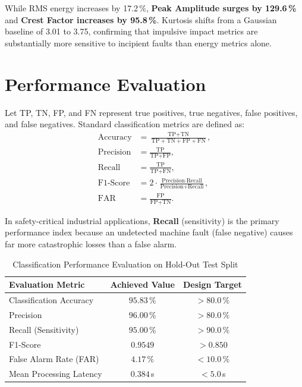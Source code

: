 \documentclass[conference,a4paper]{IEEEtran}
\begin{document}
While RMS energy increases by 17.2\,\%, \textbf{Peak Amplitude surges by 129.6\,\%} and \textbf{Crest Factor increases by 95.8\,\%}. Kurtosis shifts from a Gaussian baseline of 3.01 to 3.75, confirming that impulsive impact metrics are substantially more sensitive to incipient faults than energy metrics alone.

\section{Performance Evaluation}
Let TP, TN, FP, and FN represent true positives, true negatives, false positives, and false negatives. Standard classification metrics are defined as:
\begin{align}
    \text{Accuracy}  &= \frac{\text{TP} + \text{TN}}{\text{TP} + \text{TN} + \text{FP} + \text{FN}}, \label{eq:acc} \\
    \text{Precision} &= \frac{\text{TP}}{\text{TP} + \text{FP}}, \label{eq:prec} \\
    \text{Recall}    &= \frac{\text{TP}}{\text{TP} + \text{FN}}, \label{eq:rec} \\
    \text{F1-Score}  &= 2 \cdot \frac{\text{Precision} \cdot \text{Recall}}{\text{Precision} + \text{Recall}}, \label{eq:f1} \\
    \text{FAR}       &= \frac{\text{FP}}{\text{FP} + \text{TN}}. \label{eq:far}
\end{align}

In safety-critical industrial applications, \textbf{Recall} (sensitivity) is the primary performance index because an undetected machine fault (false negative) causes far more catastrophic losses than a false alarm.

\begin{table}[htbp]
\centering
\caption{Classification Performance Evaluation on Hold-Out Test Split}
\begin{tabular}{@{}lcc@{}}
\toprule
\textbf{Evaluation Metric} & \textbf{Achieved Value} & \textbf{Design Target} \\
\midrule
Classification Accuracy    & $\mathbf{95.83\,\%}$    & $> 80.0\,\%$ \\
Precision                  & $\mathbf{96.00\,\%}$    & $> 80.0\,\%$ \\
Recall (Sensitivity)       & $\mathbf{95.00\,\%}$    & $> 90.0\,\%$ \\
F1-Score                   & $\mathbf{0.9549}$       & $> 0.850$ \\
False Alarm Rate (FAR)     & $\mathbf{4.17\,\%}$     & $< 10.0\,\%$ \\
Mean Processing Latency    & $\mathbf{0.384}$\,s     & $< 5.0$\,s \\
\bottomrule
\end{tabular}
\label{tab:performance_eval}
\end{table}
\end{document}
